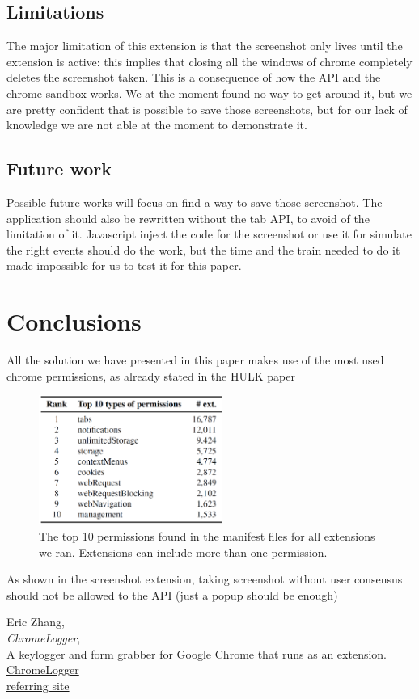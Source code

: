 \documentclass[12pt]{article}
\begin{document}
\begin{multicols}{2}
\subsection*{Limitations}
The major limitation of this extension is that the screenshot only lives until the extension is active: this implies that closing all the windows of chrome completely deletes the screenshot taken.
This is a consequence of how the API and the chrome sandbox works. We at the moment found no way to get around it, but we are pretty confident that is possible to save those screenshots, but for our lack of knowledge we are not able at the moment to demonstrate it.
\subsection*{Future work}
Possible future works will focus on find a way to save those screenshot.
The application should also be rewritten without the tab API, to avoid of the limitation of it.
Javascript inject the code for the screenshot or use it for simulate the right events should do the work, but the time and the train needed to do it made impossible for us to test it for this paper.
\section*{Conclusions}
All the solution we have presented in this paper makes use of the most used chrome permissions, as already stated in the HULK paper\cite{HULK}
\begin{figure}[H]
	\begin{center}
		\includegraphics[width=6cm]{permission.png}
		\caption{The top 10 permissions found in the manifest
			files for all extensions we ran. Extensions can include			
			more than one permission.}
	\end{center}
\end{figure}
As shown in the screenshot extension, taking screenshot without user consensus should not be allowed to the API (just a popup should be enough)
\begin{thebibliography}{2}
	Eric Zhang,\\
	\emph{ChromeLogger},\\
A keylogger and form grabber for Google Chrome that runs as an extension.\\
\href{https://github.com/Xeroday/ChromeLogger}{ChromeLogger}\\
\href{https://www.ericzhang.me/projects/chromelogger/}{referring site}


\end{thebibliography}
\end{multicols}
\end{document}

